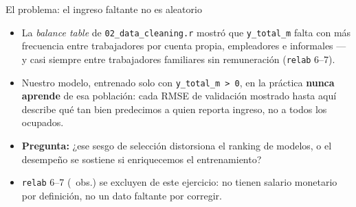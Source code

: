 \documentclass[aspectratio=169]{beamer}
\begin{document}
\begin{frame}{El problema: el ingreso faltante no es aleatorio}
  \begin{itemize}
    \item La \emph{balance table} de \texttt{02\_data\_cleaning.r} mostró que
      \texttt{y\_total\_m} falta con más frecuencia entre trabajadores por
      cuenta propia, empleadores e informales --- y casi siempre entre
      trabajadores familiares sin remuneración (\texttt{relab} 6--7).
    \item Nuestro modelo, entrenado solo con \texttt{y\_total\_m > 0}, en la
      práctica \textbf{nunca aprende} de esa población: cada RMSE de
      validación mostrado hasta aquí describe qué tan bien predecimos a quien
      reporta ingreso, no a todos los ocupados.
    \item \textbf{Pregunta:} ¿ese sesgo de selección distorsiona el ranking de
      modelos, o el desempeño se sostiene si enriquecemos el entrenamiento?
    \item \texttt{relab} 6--7 (\ImpNRelabExcl\ obs.) se excluyen de este
      ejercicio: no tienen salario monetario por definición, no un dato
      faltante por corregir.
  \end{itemize}
\end{frame}
\end{document}
